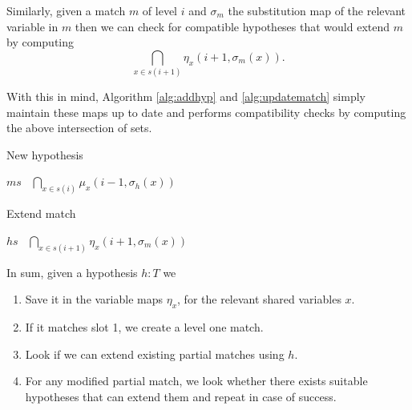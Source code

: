\documentclass[runningheads]{llncs}
\begin{document}
Similarly, given a match $m$ of level $i$ and $\sigma_m$ the substitution map of the relevant  variable in $m$ then we can check for compatible hypotheses that would extend $m$ by computing
\[
  \bigcap_{x \in s(i + 1)} \eta_x \left(i + 1, \sigma_m(x)\right).
\]

With this in mind, Algorithm \ref{alg:addhyp} and \ref{alg:updatematch} simply maintain these maps up to date and performs compatibility checks by computing the above intersection of sets.

\begin{algorithm}
    \caption{New hypothesis}\label{alg:addhyp}
        {
        $ms$ \gets \ $\bigcap_{x \in s(i)} \mu_x \left(i - 1, \sigma_h(x)\right)$\;
        }
\end{algorithm}

\begin{algorithm}
    \caption{Extend match}\label{alg:updatematch}
        $hs$ \gets \ $\bigcap_{x \in s(i + 1)} \eta_x \left(i + 1, \sigma_m(x)\right)$\\
\end{algorithm}

In sum, given a hypothesis $h :T$ we
\begin{enumerate}
\item Save it in the variable maps $\eta_x$, for the relevant shared variables $x$.
\item If it matches slot 1, we create a level one match.
\item Look if we can extend existing partial matches using $h$.
\item For any modified partial match, we look whether there exists suitable hypotheses that can extend them and repeat in case of success.
\end{enumerate}
\end{document}
